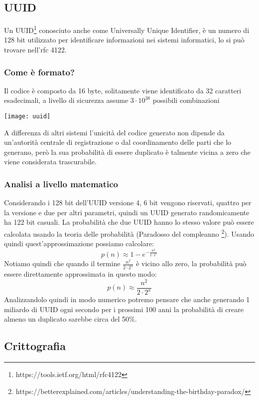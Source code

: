 \subsection{UUID}
\hspace{\parindent}Un UUID\footnote{https://tools.ietf.org/html/rfc4122} conosciuto anche come Universally Unique Identifier, è un numero di 128 bit utilizzato per identificare informazioni nei sistemi informatici, lo si può trovare nell'rfc 4122.
\subsubsection{Come è formato?}
Il codice è composto da 16 byte, solitamente viene identificato da 32 caratteri esadecimali, a livello di sicurezza assume $ 3 \cdot 10^{38}$ possibili combinazioni
\begin{center}
\texttt{[image: uuid]}
\end{center}
A differenza di altri sistemi l'unicità del codice generato non dipende da un'autorità centrale di registrazione o dal coordinamento delle parti che lo generano, però la sua probabilità di essere duplicato è talmente vicina a zero che viene considerata trascurabile.

\subsubsection{Analisi a livello matematico}

Considerando i 128 bit dell'UUID versione 4, 6 bit vengono riservati, quattro per la versione e due per altri parametri, quindi un UUID generato randomicamente ha 122 bit casuali. La probabilità che due UUID hanno lo stesso valore può essere calcolata usando la teoria delle probabilità (Paradosso del compleanno \footnote{https://betterexplained.com/articles/understanding-the-birthday-paradox/}). Usando quindi quest'approssimazione possiamo calcolare:
\begin{equation}
p(n) \approx 1- e^{-\frac{n^2}{2\cdot 2^x}}
\end{equation}
Notiamo quindi che quando il termine $ \frac{n^2}{2\cdot 2^x}$ è vicino allo zero, la probabilità può essere direttamente approssimata in questo modo:
\begin{equation}
p(n) \approx \frac{n^2}{2\cdot 2^x}
\end{equation}
Analizzandolo quindi in modo numerico potremo pensare che anche generando 1 miliardo di UUID ogni secondo per i prossimi 100 anni la probabilità di creare almeno un duplicato sarebbe circa del 50\%.

\subsection{Crittografia}